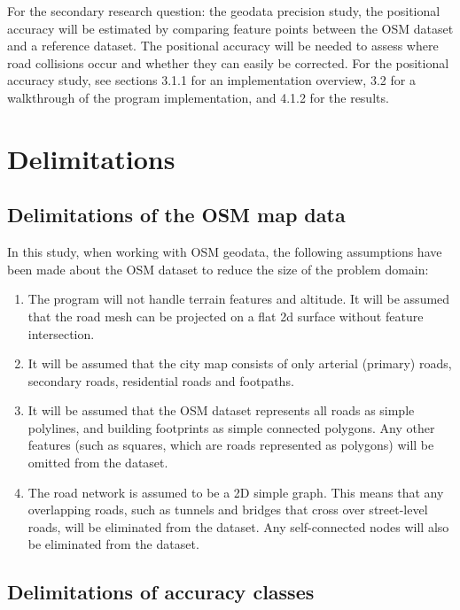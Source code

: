\documentclass{kththesis}
\begin{document}
For the secondary research question: the geodata precision study, the positional accuracy will be estimated by comparing feature points between the OSM dataset and a reference dataset.
The positional accuracy will be needed to assess where road collisions occur and whether they can easily be corrected.
For the positional accuracy study, see sections 3.1.1 for an implementation overview, 3.2 for a walkthrough of the program implementation, and 4.1.2 for the results.

\section{Delimitations}

\subsection{Delimitations of the OSM map data}

In this study, when working with OSM geodata, the following assumptions have been made about the OSM dataset to reduce the size of the problem domain:

\begin{enumerate}
    \item The program will not handle terrain features and altitude. It will be assumed that the road mesh can be projected on a flat 2d surface without feature intersection.
    \item It will be assumed that the city map consists of only arterial (primary) roads, secondary roads, residential roads and footpaths.
    \item It will be assumed that the OSM dataset represents all roads as simple polylines, and building footprints as simple connected polygons. Any other features (such as squares, which are roads represented as polygons) will be omitted from the dataset.
    \item The road network is assumed to be a 2D simple graph. This means that any overlapping roads, such as tunnels and bridges that cross over street-level roads, will be eliminated from the dataset. Any self-connected nodes will also be eliminated from the dataset.
\end{enumerate}

\subsection{Delimitations of accuracy classes}
\end{document}
